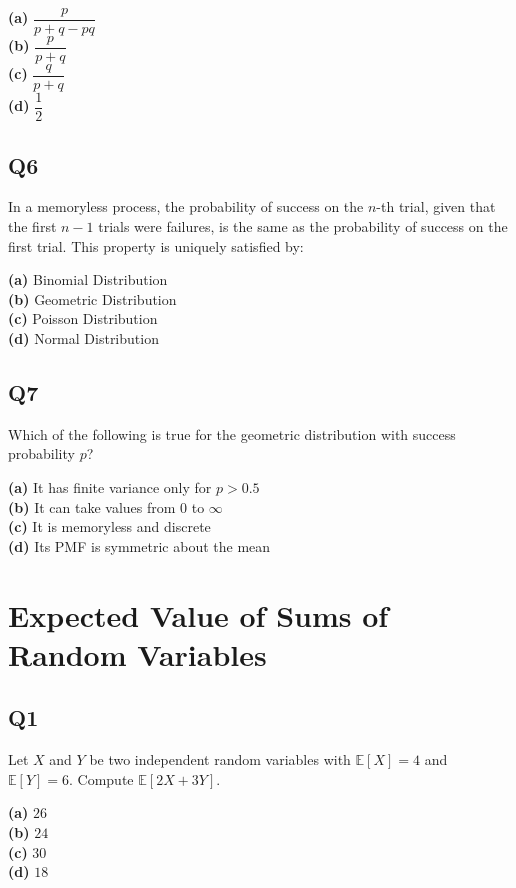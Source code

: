 \textbf{(a)} $\dfrac{p}{p + q - pq}$  \\
\textbf{(b)} $\dfrac{p}{p + q}$  \\
\textbf{(c)} $\dfrac{q}{p + q}$  \\
\textbf{(d)} $\dfrac{1}{2}$


\subsection*{Q6}
In a memoryless process, the probability of success on the $n$-th trial, given that the first $n-1$ trials were failures, is the same as the probability of success on the first trial. This property is uniquely satisfied by:

\textbf{(a)} Binomial Distribution  \\
\textbf{(b)} Geometric Distribution  \\
\textbf{(c)} Poisson Distribution  \\
\textbf{(d)} Normal Distribution

\subsection*{Q7}
Which of the following is true for the geometric distribution with success probability $p$?

\textbf{(a)} It has finite variance only for $p > 0.5$  \\
\textbf{(b)} It can take values from $0$ to $\infty$  \\
\textbf{(c)} It is memoryless and discrete  \\
\textbf{(d)} Its PMF is symmetric about the mean

\section{Expected Value of Sums of Random Variables}

\subsection*{Q1}
Let $X$ and $Y$ be two independent random variables with $\mathbb{E}[X] = 4$ and $\mathbb{E}[Y] = 6$. Compute $\mathbb{E}[2X + 3Y]$.

\textbf{(a)} $26$  \\
\textbf{(b)} $24$  \\
\textbf{(c)} $30$  \\
\textbf{(d)} $18$

